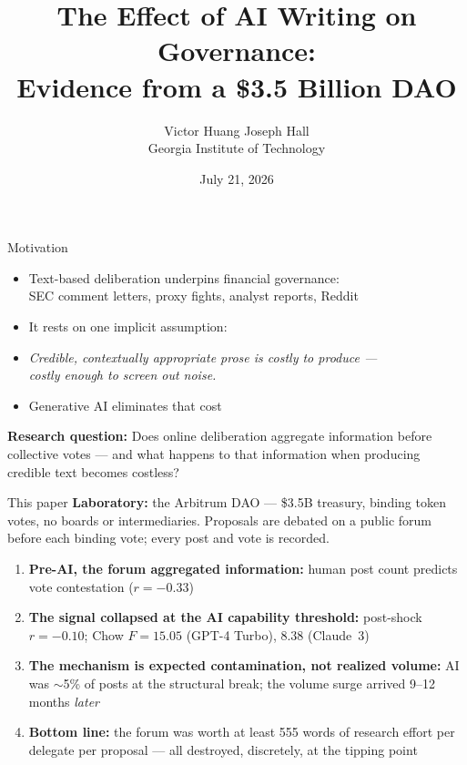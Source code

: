 \documentclass[11pt,aspectratio=169]{beamer}
\title{\textbf{The Effect of AI Writing on Governance:\\
Evidence from a \$3.5 Billion DAO}}
\author{Victor Huang \quad Joseph Hall\\[2pt] \small Georgia Institute of Technology}
\institute{FSIL Meeting}
\date{July 21, 2026}
\newenvironment{wideitemize}{\begin{itemize}\setlength{\itemsep}{0.7em}}{\end{itemize}}
\begin{document}
\begin{frame}
  \titlepage
\end{frame}

\begin{frame}{Motivation}
  \begin{wideitemize}
    \item Text-based deliberation underpins financial governance:\\
      SEC comment letters, proxy fights, analyst reports, Reddit
    \item It rests on one implicit assumption:
    \item[] \begin{center}\emph{Credible, contextually appropriate prose is costly to produce ---\\
      costly enough to screen out noise.}\end{center}
    \item \alert{Generative AI eliminates that cost}
  \end{wideitemize}
  \vspace{0.6em}
  \textbf{Research question:} Does online deliberation aggregate information before
  collective votes --- and what happens to that information when producing
  credible text becomes costless?
\end{frame}

\begin{frame}{This paper}
  \textbf{Laboratory:} the Arbitrum DAO --- \$3.5B treasury, binding token votes, no
  boards or intermediaries. Proposals are debated on a public forum before each binding
  vote; every post and vote is recorded.
  \vspace{0.5em}
  \begin{enumerate}
    \setlength{\itemsep}{0.5em}
    \item \textbf{Pre-AI, the forum aggregated information:} human post count predicts
      vote contestation ($r = -0.33$)
    \item \textbf{The signal collapsed at the AI capability threshold:} post-shock
      $r = -0.10$; Chow $F = 15.05$ (GPT-4 Turbo), $8.38$ (Claude~3)
    \item \textbf{The mechanism is expected contamination, not realized volume:} AI was $\sim$5\% of posts at the structural break; the volume surge arrived 9--12 months \emph{later}
    \item \textbf{Bottom line:} the forum was worth \alert{at least 555 words of
      research effort per delegate per proposal} --- all destroyed, discretely, at
      the tipping point
  \end{enumerate}
\end{frame}
\end{document}
